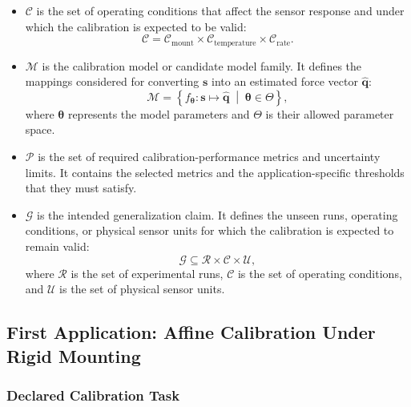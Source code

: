 \documentclass[11pt,a4paper]{article}
\begin{document}
\begin{itemize}
    \item $\mathcal{C}$ is the set of operating conditions that affect the
    sensor response and under which the calibration is expected to be valid:
    \begin{equation}
        \mathcal{C}
        =
        \mathcal{C}_{\mathrm{mount}}
        \times
        \mathcal{C}_{\mathrm{temperature}}
        \times
        \mathcal{C}_{\mathrm{rate}}.
    \end{equation}

    \item $\mathcal{M}$ is the calibration model or candidate model family. It
    defines the mappings considered for converting $\mathbf{s}$ into an
    estimated force vector $\widehat{\mathbf{q}}$:
    \begin{equation}
        \mathcal{M}
        =
        \left\{
            f_{\boldsymbol{\theta}} :
            \mathbf{s} \mapsto \widehat{\mathbf{q}}
            \;\middle|\;
            \boldsymbol{\theta} \in \Theta
        \right\},
    \end{equation}
    where $\boldsymbol{\theta}$ represents the model parameters and $\Theta$
    is their allowed parameter space.

    \item $\mathcal{P}$ is the set of required calibration-performance metrics
    and uncertainty limits. It contains the selected metrics and the
    application-specific thresholds that they must satisfy.

    \item $\mathcal{G}$ is the intended generalization claim. It defines the
    unseen runs, operating conditions, or physical sensor units for which the
    calibration is expected to remain valid:
    \begin{equation}
        \mathcal{G}
        \subseteq
        \mathcal{R}
        \times
        \mathcal{C}
        \times
        \mathcal{U},
    \end{equation}
    where $\mathcal{R}$ is the set of experimental runs, $\mathcal{C}$ is the
    set of operating conditions, and $\mathcal{U}$ is the set of physical
    sensor units.
\end{itemize}

\newpage
\subsection{First Application: Affine Calibration Under Rigid Mounting}

\subsubsection{Declared Calibration Task}
\end{document}

